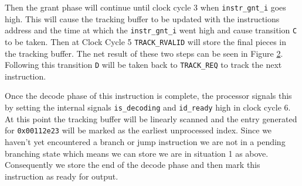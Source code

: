 \begin{figure}[htbp]
	\begin{subfigure}{\linewidth}
		
	\end{subfigure}
	\begin{subfigure}{\linewidth}
		
	\end{subfigure}
	\caption{}
	\label{fig:load-example-step-1}
\end{figure}


Then the grant phase will continue until clock cycle 3 when \texttt{instr\_gnt\_i} goes high. This will cause the tracking buffer to be updated with the instructions address and the time at which the \texttt{instr\_gnt\_i} went high and cause transition \texttt{C} to be taken. Then at Clock Cycle 5 \texttt{TRACK\_RVALID} will store the final pieces in the tracking buffer. The net result of these two steps can be seen in Figure \ref{fig:load-example-step-2}. Following this transition \texttt{D} will be taken back to \texttt{TRACK\_REQ} to track the next instruction.

\begin{figure}[htbp]
	\begin{subfigure}{\linewidth}
		
	\end{subfigure}
	\begin{subfigure}{\linewidth}
		
	\end{subfigure}
	\caption{}
	\label{fig:load-example-step-2}
\end{figure}

Once the decode phase of this instruction is complete, the processor signals this by setting the internal signals \texttt{is\_decoding} and \texttt{id\_ready} high in clock cycle 6. At this point the tracking buffer will be linearly scanned and the entry generated for \texttt{0x00112e23} will be marked as the earliest unprocessed index. Since we haven't yet encountered a branch or jump instruction we are not in a pending branching state which means we can store we are in situation 1 as above. Consequently we store the end of the decode phase and then mark this instruction as ready for output. 

\begin{figure}[htbp]
	
	\caption{}
	\label{fig:load-example-step-3}
\end{figure}

